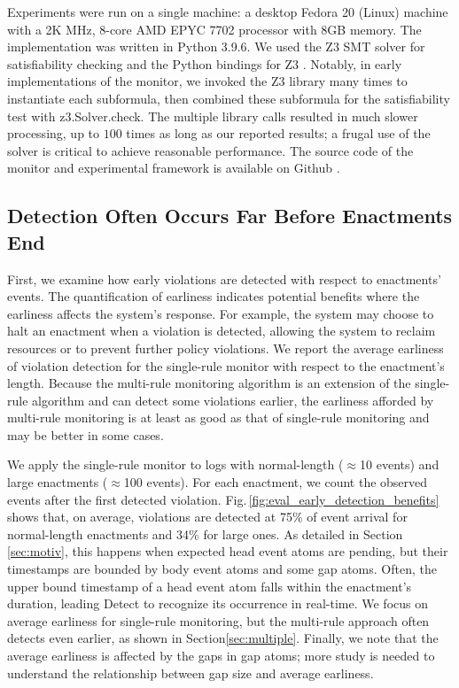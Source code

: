 Experiments were run on a single machine:
a desktop Fedora 20 (Linux) machine
with a 2K MHz, 8-core AMD EPYC 7702 processor with 8GB memory.
The implementation was written in Python 3.9.6.
We used the Z3 SMT solver \cite{de2008z3} for satisfiability checking
and the Python bindings for Z3 \cite{z3py}.
Notably,
in early implementations of the monitor,
we invoked the Z3 library many times to instantiate each subformula,
then combined these subformula for the satisfiability test
with z3.Solver.check.
The multiple library calls resulted in much slower processing,
up to $100$ times as long as our reported results;
a frugal use of the solver is critical
to achieve reasonable performance.
The source code of the monitor
and experimental framework is available on Github
\cite{mackeymultirulemonitor}.

\subsection{Detection Often Occurs Far Before Enactments End}
\label{subsec:earliness}

First, we examine how early
violations are detected
with respect to enactments' events.
The quantification of earliness
indicates potential benefits
where the earliness affects the system's response.
For example,
the system may choose to halt an enactment
when a violation is detected,
allowing the system to reclaim resources
or to prevent further policy violations.
We report the average earliness of violation detection
for the single-rule monitor
with respect to the enactment's length.
Because the multi-rule monitoring algorithm
is an extension of the single-rule algorithm
and can detect some violations earlier,
the earliness afforded by multi-rule monitoring
is at least as good as that of single-rule monitoring
and may be better in some cases.

We apply the single-rule monitor
to logs with normal-length ($\approx$10 events)
and large enactments ($\approx$100 events).
For each enactment, we count the observed events after the first
detected violation.
Fig.\,\ref{fig:eval_early_detection_benefits} shows that,
on average, violations are detected at 75\% of
event arrival for normal-length enactments and 34\% for large ones.
As detailed in Section \ref{sec:motiv},
this happens when expected head event atoms are pending,
but their timestamps are bounded by body event atoms
and some gap atoms.
Often,
the upper bound timestamp of a head event atom falls within the enactment's duration,
leading {\sf Detect} to recognize its occurrence in real-time.
We focus on average earliness for single-rule monitoring,
but the multi-rule approach often detects even earlier,
as shown in Section\:\ref{sec:multiple}.
Finally, we note that the average earliness
is affected by the gaps in gap atoms;
more study is needed to understand the relationship
between gap size and average earliness. 

